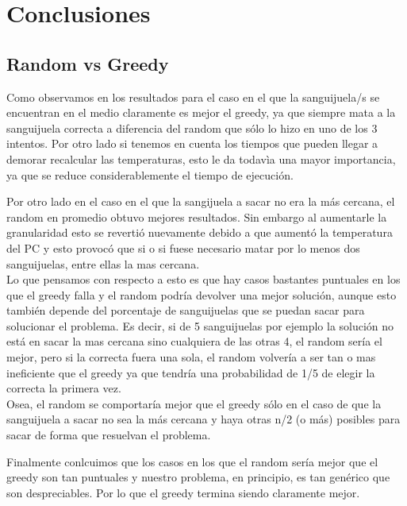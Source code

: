 \section{Conclusiones}

\subsection{Random vs Greedy}

Como observamos en los resultados para el caso en el que la sanguijuela/s se encuentran en el medio claramente es mejor el greedy, ya que siempre mata a la sanguijuela correcta a diferencia del random que sólo lo hizo en uno de los 3 intentos. Por otro lado si tenemos en cuenta los tiempos que pueden llegar a demorar recalcular las temperaturas, esto le da todavìa una mayor importancia, ya que se reduce considerablemente el tiempo de ejecución.

Por otro lado en el caso en el que la sangijuela a sacar no era la más cercana, el random en promedio obtuvo mejores resultados. Sin embargo al aumentarle la granularidad esto se revertió nuevamente debido a que aumentó la temperatura del PC y esto provocó que si o si fuese necesario matar por lo menos dos sanguijuelas, entre ellas la mas cercana. \\
Lo que pensamos con respecto a esto es que hay casos bastantes puntuales en los que el greedy falla y el random podría devolver una mejor solución, aunque esto también depende del porcentaje de sanguijuelas que se puedan sacar para solucionar el problema. Es decir, si de 5 sanguijuelas por ejemplo la solución no está en sacar la mas cercana sino cualquiera de las otras 4, el random sería el mejor, pero si la correcta fuera una sola, el random volvería a ser tan o mas ineficiente que el greedy ya que tendría una probabilidad de 1/5 de elegir la correcta la primera vez.\\
Osea, el random se comportaría mejor que el greedy sólo en el caso de que la sanguijuela a sacar no sea la más cercana y haya otras n/2 (o más) posibles para sacar de forma que resuelvan el problema.

Finalmente conlcuimos que los casos en los que el random sería mejor que el greedy son tan puntuales y nuestro problema, en principio, es tan genérico que son despreciables. Por lo que el greedy termina siendo claramente mejor.






